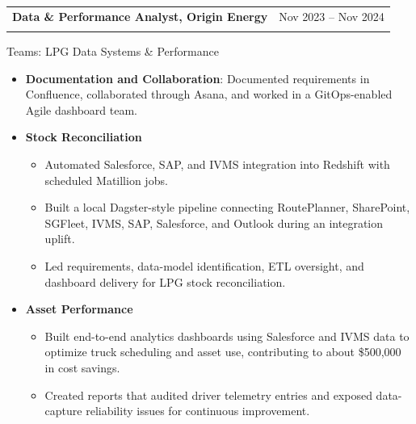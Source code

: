 \documentclass[10pt,a4paper]{article}
\makeatletter
\newenvironment{resumejob}[3]{
  \par\addvspace{0.45em}
  \noindent\begin{tabularx}{\textwidth}{@{}>{\raggedright\arraybackslash}X>{\raggedleft\arraybackslash}p{0.3\textwidth}@{}}
    \textbf{\textcolor{textdark}{#1}} & \textcolor{mutedtext}{#2} \\
    \multicolumn{2}{@{}l@{}}{\textit{\textcolor{mutedtext}{#3}}}
  \end{tabularx}
  \vspace{-0.55em}
}{
  \par\addvspace{0.2em}
}
\makeatother
\begin{document}
\begin{resumejob}{Data \& Performance Analyst, Origin Energy}{Nov 2023 -- Nov 2024}{Melbourne}
Teams: LPG Data Systems \& Performance
\begin{itemize}
  \item \textbf{Documentation and Collaboration}: Documented requirements in Confluence, collaborated through Asana, and worked in a GitOps-enabled Agile dashboard team.
  \item \textbf{Stock Reconciliation}
  \begin{itemize}
    \item Automated Salesforce, SAP, and IVMS integration into Redshift with scheduled Matillion jobs.
    \item Built a local Dagster-style pipeline connecting RoutePlanner, SharePoint, SGFleet, IVMS, SAP, Salesforce, and Outlook during an integration uplift.
    \item Led requirements, data-model identification, ETL oversight, and dashboard delivery for LPG stock reconciliation.
  \end{itemize}
  \item \textbf{Asset Performance}
  \begin{itemize}
    \item Built end-to-end analytics dashboards using Salesforce and IVMS data to optimize truck scheduling and asset use, contributing to about \$500,000 in cost savings.
    \item Created reports that audited driver telemetry entries and exposed data-capture reliability issues for continuous improvement.
  \end{itemize}
\end{itemize}
\end{resumejob}
\end{document}
